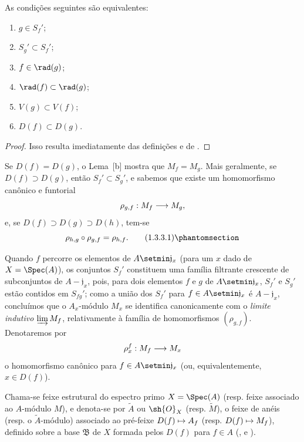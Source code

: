 \documentclass[oneside]{amsart}
\makeatletter
\newcommand{\ega@arrow}[2]{\mathchoice{#1}{#2}{#2}{#2}}
\let\ega@shortmapsto\mapsto
\renewcommand{\to}{\ega@arrow{\longrightarrow}{\rightarrow}}
\renewcommand{\mapsto}{\ega@arrow{\longmapsto}{\ega@shortmapsto}}
\newcommand{\oldpage}[2][]{{\marginnote{\normalfont\textbf{#1}~|~#2}}\ignorespaces}
\let\EGAOriginalLabel\label
\renewcommand{\label}[1]{\phantomsection\EGAOriginalLabel{#1}}
\makeatother
\begin{document}
\begin{lemma}[1.3.2]
\label{I.1.3.2}
As condições seguintes são equivalentes:
\begin{enumerate}
  \item[{\rm(a)}] $g\in S_f'$;
  \item[{\rm(b)}] $S_g'\subset S_f'$;
  \item[{\rm(c)}] $f\in\rad(g)$;
  \item[{\rm(d)}] $\rad(f)\subset\rad(g)$;
  \item[{\rm(e)}] $V(g)\subset V(f)$;
  \item[{\rm(f)}] $D(f)\subset D(g)$.
\end{enumerate}
\end{lemma}

\begin{proof}
Isso resulta imediatamente das definições e de .
\end{proof}

\begin{env}[1.3.3]
\label{I.1.3.3}
Se $D(f)=D(g)$, o Lema~[b] mostra que $M_f=M_g$.
Mais geralmente, se $D(f)\supset D(g)$, então $S_f'\subset S_g'$, e sabemos  que existe um homomorfismo canônico e funtorial
\[
  \rho_{g,f}:M_f\to M_g,
\]
e, se $D(f)\supset D(g)\supset D(h)$, tem-se 
\[
  \rho_{h,g}\circ\rho_{g,f}=\rho_{h,f}.
  \tag{1.3.3.1}
  \label{I.1.3.3.1}
\]
\end{env}

\oldpage[I]{85}
Quando $f$ percorre os elementos de $A\setmin\mathfrak{j}_x$ (para um $x$ dado de $X=\Spec(A)$), os conjuntos $S_f'$ constituem uma família filtrante crescente de subconjuntos de $A-\mathfrak{j}_x$, pois, para dois elementos $f$ e $g$ de $A\setmin\mathfrak{j}_x$, $S_f'$ e $S_g'$ estão contidos em $S_{fg}'$;
como a união dos $S_f'$ para $f\in A\setmin\mathfrak{j}_x$ é $A-\mathfrak{j}_x$, concluímos  que o $A_x$-módulo $M_x$ se identifica canonicamente com o \emph{limite indutivo} $\varinjlim M_f$, relativamente à família de homomorfismos $(\rho_{g,f})$.
Denotaremos por
\[
  \rho_x^f:M_f\to M_x
\]
o homomorfismo canônico para $f\in A\setmin\mathfrak{j}_x$ (ou, equivalentemente, $x\in D(f)$).

\begin{definition}[1.3.4]
\label{I.1.3.4}
Chama-se feixe estrutural do espectro primo $X=\Spec(A)$ (resp. feixe associado ao $A$-módulo $M$), e denota-se por $\widetilde{A}$ ou $\sh{O}_X$ (resp. $\widetilde{M}$), o feixe de anéis (resp. o $\widetilde{A}$-módulo) associado ao pré-feixe $D(f)\mapsto A_f$ (resp. $D(f)\mapsto M_f$), definido sobre a base $\mathfrak{B}$ de $X$ formada pelos $D(f)$ para $f\in A$ (,  e ).
\end{definition}
\end{document}

